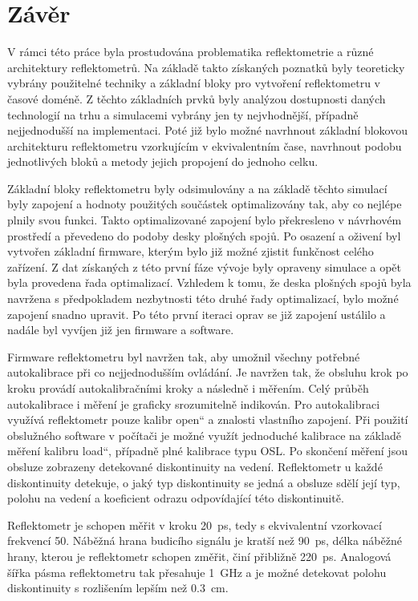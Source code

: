 \chapter{Závěr}

V rámci této práce byla prostudována problematika reflektometrie a různé architektury reflektometrů. Na základě takto získaných poznatků byly teoreticky vybrány použitelné techniky a základní bloky pro vytvoření reflektometru v časové doméně. Z těchto základních prvků byly analýzou dostupnosti daných technologií na trhu a simulacemi vybrány jen ty nejvhodnější, případně nejjednodušší na implementaci. Poté již bylo možné navrhnout základní blokovou architekturu reflektometru vzorkujícím v ekvivalentním čase, navrhnout podobu jednotlivých bloků a metody jejich propojení do jednoho celku. 

Základní bloky reflektometru byly odsimulovány a na základě těchto simulací byly zapojení a hodnoty použitých součástek optimalizovány tak, aby co nejlépe plnily svou funkci. Takto optimalizované zapojení bylo překresleno v návrhovém prostředí a převedeno do podoby desky plošných spojů. Po osazení a oživení byl vytvořen základní firmware, kterým bylo již možné zjistit funkčnost celého zařízení. Z dat získaných z této první fáze vývoje byly opraveny simulace a opět byla provedena řada optimalizací. Vzhledem k tomu, že deska plošných spojů byla navržena s předpokladem nezbytnosti této druhé řady optimalizací, bylo možné zapojení snadno upravit. Po této první iteraci oprav se již zapojení ustálilo a nadále byl vyvíjen již jen firmware a software.

Firmware reflektometru byl navržen tak, aby umožnil všechny potřebné autokalibrace při co nejjednodušším ovládání. Je navržen tak, že obsluhu krok po kroku provádí autokalibračními kroky a následně i měřením. Celý průběh autokalibrace i měření je graficky srozumitelně indikován. Pro autokalibraci využívá reflektometr pouze kalibr \quotedblbase open\textquotedblleft{} a znalosti vlastního zapojení. Při použití obslužného software v počítači je možné využít jednoduché kalibrace na základě měření kalibru \quotedblbase load\textquotedblleft , případně plné kalibrace typu OSL. Po skončení měření jsou obsluze zobrazeny detekované diskontinuity na vedení. Reflektometr u každé diskontinuity detekuje, o jaký typ diskontinuity se jedná a obsluze sdělí její typ, polohu na vedení a koeficient odrazu odpovídající této diskontinuitě.

Reflektometr je schopen měřit v kroku \SI{20}{\pico\second}, tedy s ekvivalentní vzorkovací frekvencí \SI{50}{\gigasample}. Náběžná hrana budicího signálu je kratší než \SI{90}{\pico\second}, délka náběžné hrany, kterou je reflektometr schopen změřit, činí přibližně \SI{220}{\pico\second}. Analogová šířka pásma reflektometru tak přesahuje \SI{1}{\giga\hertz} a je možné detekovat polohu diskontinuity s rozlišením lepším než \SI{0.3}{\centi\meter}.

